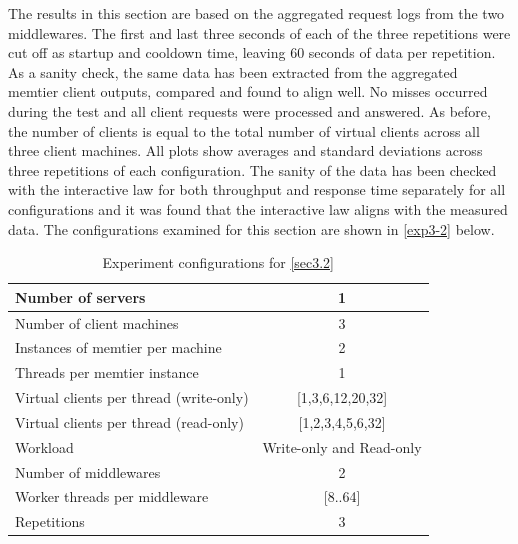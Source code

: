 \documentclass[11pt,a4paper]{article}
\begin{document}
The results in this section are based on the aggregated request logs from the two middlewares. The first and last three seconds of each of the three repetitions were cut off as startup and cooldown time, leaving 60 seconds of data per repetition. As a sanity check, the same data has been extracted from the aggregated memtier client outputs, compared and found to align well. No misses occurred during the test and all client requests were processed and answered. As before, the number of clients is equal to the total number of virtual clients across all three client machines. All plots show averages and standard deviations across three repetitions of each configuration. The sanity of the data has been checked with the interactive law for both throughput and response time separately for all configurations and it was found that the interactive law aligns with the measured data. The configurations examined for this section are shown in \autoref{exp3-2} below.

\begin{table}
    \centering
	\begin{tabular}{|l|c|}
		\hline Number of servers                & 1                        \\ 
		\hline Number of client machines        & 3                        \\ 
		\hline Instances of memtier per machine & 2                        \\ 
		\hline Threads per memtier instance     & 1                        \\
		\hline Virtual clients per thread (write-only)  & [1,3,6,12,20,32] \\ 
		\hline Virtual clients per thread (read-only)   & [1,2,3,4,5,6,32] \\ 
		\hline Workload                         & Write-only and Read-only \\
		\hline Number of middlewares            & 2                        \\
		\hline Worker threads per middleware    & [8..64]                  \\
		\hline Repetitions                      & 3                        \\ 
		\hline 
	\end{tabular}
	\caption{Experiment configurations for \autoref{sec3.2}} \label{exp3-2}
\end{table}
\end{document}
